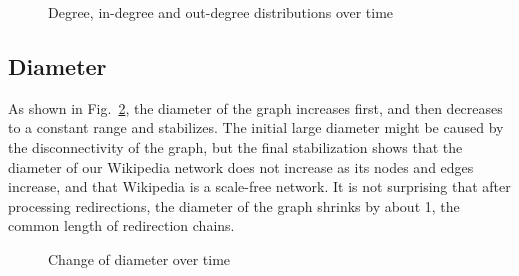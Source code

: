 \documentclass[10pt,twocolumn]{article}
\begin{document}
\begin{figure}
\caption{Degree, in-degree and out-degree distributions over time \label{fig:degree}}
\end{figure}

\subsection{Diameter}
As shown in Fig.~\ref{fig:diameter}, the diameter of the graph increases first, and then decreases to a constant range and stabilizes. The initial large diameter might be caused by the disconnectivity of the graph, but the final stabilization shows that the diameter of our Wikipedia network does not increase as its nodes and edges increase, and that Wikipedia is a scale-free network. It is not surprising that after processing redirections, the diameter of the graph shrinks by about 1, the common length of redirection chains.

\begin{figure}[ht]
\caption{Change of diameter over time\label{fig:diameter}}
\end{figure}
\end{document}
